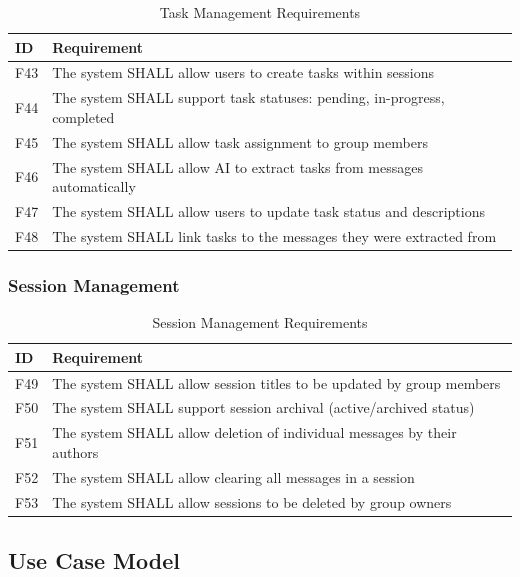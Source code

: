 \documentclass[11pt,a4paper]{article}
\begin{document}
\begin{table}[H]
\centering
\begin{tabular}{p{1.5cm}p{11.5cm}}
\toprule
\textbf{ID} & \textbf{Requirement} \\
\midrule
F43 & The system SHALL allow users to create tasks within sessions \\
F44 & The system SHALL support task statuses: pending, in-progress, completed \\
F45 & The system SHALL allow task assignment to group members \\
F46 & The system SHALL allow AI to extract tasks from messages automatically \\
F47 & The system SHALL allow users to update task status and descriptions \\
F48 & The system SHALL link tasks to the messages they were extracted from \\
\bottomrule
\end{tabular}
\caption{Task Management Requirements}
\end{table}

\subsubsection{Session Management}

\begin{table}[H]
\centering
\begin{tabular}{p{1.5cm}p{11.5cm}}
\toprule
\textbf{ID} & \textbf{Requirement} \\
\midrule
F49 & The system SHALL allow session titles to be updated by group members \\
F50 & The system SHALL support session archival (active/archived status) \\
F51 & The system SHALL allow deletion of individual messages by their authors \\
F52 & The system SHALL allow clearing all messages in a session \\
F53 & The system SHALL allow sessions to be deleted by group owners \\
\bottomrule
\end{tabular}
\caption{Session Management Requirements}
\end{table}

\subsection{Use Case Model}
\end{document}
